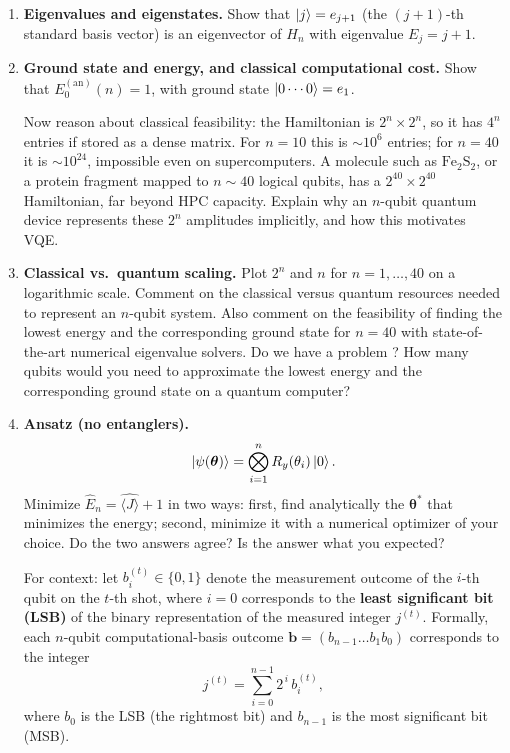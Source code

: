 \documentclass[11pt]{article}
\begin{document}
\begin{enumerate}[label=(\alph*)]
\item \textbf{Eigenvalues and eigenstates.}
Show that $\ket{j}=e_{j+1}$ (the $(j+1)$-th standard basis vector) is an eigenvector of $H_n$ with eigenvalue $E_j=j+1$.

\item \textbf{Ground state and energy, and classical computational cost.}
Show that $E_0^{(\mathrm{an})}(n)=1$, with ground state $\ket{0\cdots0}=e_1$.

Now reason about classical feasibility:
the Hamiltonian is $2^n\times2^n$, so it has $4^n$ entries if stored as a dense matrix.
For $n=10$ this is $\sim10^6$ entries; for $n=40$ it is $\sim10^{24}$, impossible even on supercomputers.
A molecule such as $\mathrm{Fe}_2\mathrm{S}_2$, or a protein fragment mapped to $n\sim40$ logical qubits, has a $2^{40}\times2^{40}$ Hamiltonian, far beyond HPC capacity.
Explain why an $n$-qubit quantum device represents these $2^n$ amplitudes implicitly, and how this motivates VQE.

\item \textbf{Classical vs.\ quantum scaling.}
Plot $2^n$ and $n$ for $n=1,\dots,40$ on a logarithmic scale. Comment on the classical versus quantum resources needed to represent an $n$-qubit system. Also comment on the feasibility of finding the lowest energy and the corresponding ground state for $n=40$ with state-of-the-art numerical eigenvalue solvers. Do we have a problem \smiley{}? How many qubits would you need to approximate the lowest energy and the corresponding ground state on a quantum computer?

\item \textbf{Ansatz (no entanglers).}
\[
\ket{\psi(\boldsymbol{\theta})}=\bigotimes_{i=1}^n R_y(\theta_i)\ket{0}.
\]
Minimize $\widehat{E}_n=\widehat{\langle J\rangle}+1$ in two ways: first, find analytically the $\boldsymbol{\theta}^*$ that minimizes the energy; second, minimize it with a numerical optimizer of your choice. Do the two answers agree? Is the answer what you expected?

For context: let $b_i^{(t)} \in \{0,1\}$ denote the measurement outcome of the $i$-th qubit on the $t$-th shot,
where $i=0$ corresponds to the \textbf{least significant bit (LSB)} of the binary representation of the measured integer $j^{(t)}$.
Formally, each $n$-qubit computational-basis outcome $\mathbf{b}=(b_{n-1}\dots b_1 b_0)$ corresponds to the integer
\[
j^{(t)} = \sum_{i=0}^{n-1} 2^{\,i}\, b_i^{(t)},
\]
where $b_0$ is the LSB (the rightmost bit) and $b_{n-1}$ is the most significant bit (MSB).


\end{enumerate}
\end{document}
